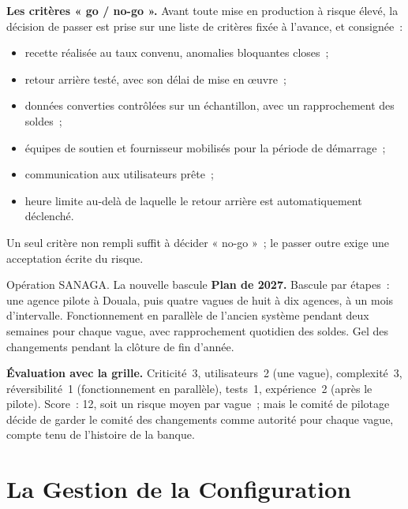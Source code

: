 \begin{boxprocedure}
\textbf{Les critères « go / no-go ».} Avant toute mise en production à
risque élevé, la décision de passer est prise sur une liste de critères
fixée à l'avance, et consignée~:
\begin{itemize}
    \item recette réalisée au taux convenu, anomalies bloquantes closes~;
    \item retour arrière testé, avec son délai de mise en œuvre~;
    \item données converties contrôlées sur un échantillon, avec un
          rapprochement des soldes~;
    \item équipes de soutien et fournisseur mobilisés pour la période de
          démarrage~;
    \item communication aux utilisateurs prête~;
    \item heure limite au-delà de laquelle le retour arrière est
          automatiquement déclenché.
\end{itemize}
Un seul critère non rempli suffit à décider « no-go »~; le passer outre
exige une acceptation écrite du risque.
\end{boxprocedure}

\begin{boxscenario}{Opération SANAGA. La nouvelle bascule}
\textbf{Plan de 2027.} Bascule par étapes~: une agence pilote à Douala, puis
quatre vagues de huit à dix agences, à un mois d'intervalle. Fonctionnement
en parallèle de l'ancien système pendant deux semaines pour chaque vague,
avec rapprochement quotidien des soldes. Gel des changements pendant la
clôture de fin d'année.

\medskip
\textbf{Évaluation avec la grille.} Criticité~3, utilisateurs~2 (une vague),
complexité~3, réversibilité~1 (fonctionnement en parallèle), tests~1,
expérience~2 (après le pilote). Score~: 12, soit un risque moyen par
vague~; mais le comité de pilotage décide de garder le comité des
changements comme autorité pour chaque vague, compte tenu de l'histoire
de la banque.
\end{boxscenario}

\section{La Gestion de la Configuration}
\label{sec:c14-config}

